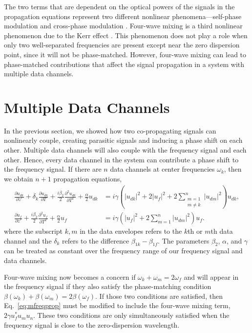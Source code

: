 The two terms that are dependent on the optical powers of the signals in the propagation equations represent two different nonlinear phenomena---self-phase modulation and cross-phase modulation \cite{Agrawal2013}. Four-wave mixing is a third nonlinear phenomenon due to the Kerr effect \cite{Agrawal2013,Boyd2003}. This phenomenon does not play a role when only two well-separated frequencies are present except near the zero dispersion point, since it will not be phase-matched. However, four-wave mixing can lead to phase-matched contributions that affect the signal propagation in a system with multiple data channels.

\section{Multiple Data Channels} \label{sec:multiple}

In the previous section, we showed how two co-propagating signals can nonlinearly couple, creating parasitic signals and inducing a phase shift on each other. Multiple data channels will also couple with the frequency signal and each other. Hence, every data channel in the system can contribute a phase shift to the frequency signal. If there are $n$ data channels at center frequencies $\omega_k$, then we obtain $n+1$ propagation equations,
%
\begin{subequations}
\begin{align}
\frac{\partial u_{dk}}{\partial z'} + \delta_k\frac{\partial u_{dk}}{\partial T} + \frac{i\beta_{2}}{2}\frac{\partial^2 u_{dk}}{\partial T^2} + \frac{\alpha}{2}u_{dk} &= i\gamma\left(|u_{dk}|^2 + 2|u_f|^2 + 2\sum_{\substack{m=1\\ m\neq k}}^n|u_{dm}|^2\right)u_{dk}, \label{eq:mdataprop} \\
\frac{\partial u_f}{\partial z'} + \frac{i\beta_{2}}{2}\frac{\partial^2 u_f}{\partial T^2} + \frac{\alpha}{2}u_f &= i\gamma\left(|u_f|^2 + 2\sum_{m=1}^n|u_{dm}|^2\right)u_f. \label{eq:mfreqprop}
\end{align}
\end{subequations}
%
where the subscript $k,m$ in the data envelopes refers to the $k$th or $m$th data channel and the $\delta_k$ refers to the difference $\beta_{1k} - \beta_{1f}$. The parameters $\beta_2$, $\alpha$, and $\gamma$ can be treated as constant over the frequency range of our frequency signal and data channels.

Four-wave mixing now becomes a concern if $\omega_k + \omega_m = 2\omega_f$ and will appear in the frequency signal if they also satisfy the phase-matching condition $\beta(\omega_k) + \beta(\omega_m) = 2\beta(\omega_f)$. If those two conditions are satisfied, then Eq.~\ref{eq:mfreqprop} must be modified to include the four-wave mixing term, $2\gamma u_f^*u_mu_n$. These two conditions are only simultaneously satisfied when the frequency signal is close to the zero-dispersion wavelength.

